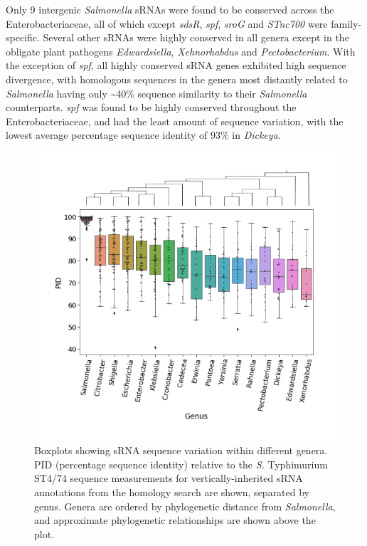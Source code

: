Only 9 intergenic \textit{Salmonella} sRNAs were found to be conserved across the Enterobacteriaceae, all of which except \textit{sdsR}, \textit{spf}, \textit{sroG} and \textit{STnc700} were family-specific. Several other sRNAs were highly conserved in all genera except in the obligate plant pathogens \textit{Edwardsiella}, \textit{Xehnorhabdus} and \textit{Pectobacterium}. With the exception of \textit{spf}, all highly conserved sRNA genes exhibited high sequence divergence, with homologous sequences in the genera most distantly related to \textit{Salmonella} having only \textasciitilde40\% sequence similarity to their \textit{Salmonella} counterparts. \textit{spf} was found to be highly conserved throughout the Enterobacteriaceae, and had the least amount of sequence variation, with the lowest average percentage sequence identity of 93\% in \textit{Dickeya}. 

\begin{figure}[H]
\includegraphics[scale=1.7]{sal/genus_PID_with_tree.png} 
\caption[Boxplots showing sRNA sequence variation within different genera]{Boxplots showing sRNA sequence variation within different genera. PID (percentage sequence identity) relative to the \textit{S.} Typhimurium ST4/74 sequence measurements for vertically-inherited sRNA annotations from the homology search are shown, separated by genus. Genera are ordered by phylogenetic distance from \textit{Salmonella}, and approximate phylogenetic relationships are shown above the plot.}
    \label{fig:PID_plots}
\end{figure}

